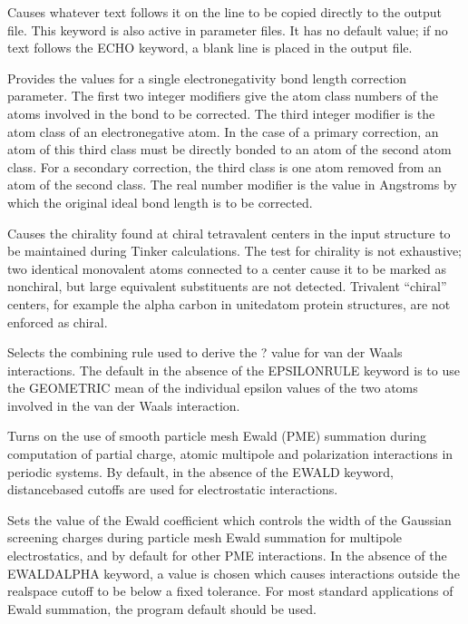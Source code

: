\documentclass[letterpaper,11pt,english]{sphinxmanual}
\begin{document}
  Causes whatever text follows it on the line to be copied directly to the output file. This keyword is also active in parameter files. It has no default value; if no text follows the ECHO keyword, a blank line is placed in the output file.


  Provides the values for a single electronegativity bond length correction parameter. The first two integer modifiers give the atom class numbers of the atoms involved in the bond to be corrected. The third integer modifier is the atom class of an electronegative atom. In the case of a primary correction, an atom of this third class must be directly bonded to an atom of the second atom class. For a secondary correction, the third class is one atom removed from an atom of the second class. The real number modifier is the value in Angstroms by which the original ideal bond length is to be corrected.


  Causes the chirality found at chiral tetravalent centers in the input structure to be maintained during Tinker calculations. The test for chirality is not exhaustive; two identical monovalent atoms connected to a center cause it to be marked as non\sphinxhyphen{}chiral, but large equivalent substituents are not detected. Trivalent “chiral” centers, for example the alpha carbon in united\sphinxhyphen{}atom protein structures, are not enforced as chiral.

  Selects the combining rule used to derive the ? value for van der Waals interactions. The default in the absence of the EPSILONRULE keyword is to use the GEOMETRIC mean of the individual epsilon values of the two atoms involved in the van der Waals interaction.

  Turns on the use of smooth particle mesh Ewald (PME) summation during computation of partial charge, atomic multipole and polarization interactions in periodic systems. By default, in the absence of the EWALD keyword, distance\sphinxhyphen{}based cutoffs are used for electrostatic interactions.

  Sets the value of the Ewald coefficient which controls the width of the Gaussian screening charges during particle mesh Ewald summation for multipole electrostatics, and by default for other PME interactions. In the absence of the EWALD\sphinxhyphen{}ALPHA keyword, a value is chosen which causes interactions outside the real\sphinxhyphen{}space cutoff to be below a fixed tolerance. For most standard applications of Ewald summation, the program default should be used.
\end{document}
